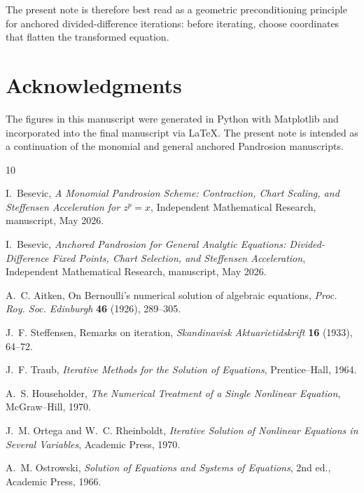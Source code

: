 \documentclass[11pt]{article}
\theoremstyle{definition}
\begin{document}
The present note is therefore best read as a geometric preconditioning principle for anchored divided-difference iterations: before iterating, choose coordinates that flatten the transformed equation.

\section*{Acknowledgments}
The figures in this manuscript were generated in Python with Matplotlib and incorporated into the final manuscript via \LaTeX. The present note is intended as a continuation of the monomial and general anchored Pandrosion manuscripts.

\begin{thebibliography}{10}

I.~Besevic,
\newblock \emph{A Monomial Pandrosion Scheme: Contraction, Chart Scaling, and Steffensen Acceleration for $z^p=x$},
\newblock Independent Mathematical Research, manuscript, May 2026.

I.~Besevic,
\newblock \emph{Anchored Pandrosion for General Analytic Equations: Divided-Difference Fixed Points, Chart Selection, and Steffensen Acceleration},
\newblock Independent Mathematical Research, manuscript, May 2026.

A.~C. Aitken,
\newblock On Bernoulli's numerical solution of algebraic equations,
\newblock \emph{Proc. Roy. Soc. Edinburgh} \textbf{46} (1926), 289--305.

J.~F. Steffensen,
\newblock Remarks on iteration,
\newblock \emph{Skandinavisk Aktuarietidskrift} \textbf{16} (1933), 64--72.

J.~F. Traub,
\newblock \emph{Iterative Methods for the Solution of Equations},
\newblock Prentice--Hall, 1964.

A.~S. Householder,
\newblock \emph{The Numerical Treatment of a Single Nonlinear Equation},
\newblock McGraw--Hill, 1970.

J.~M. Ortega and W.~C. Rheinboldt,
\newblock \emph{Iterative Solution of Nonlinear Equations in Several Variables},
\newblock Academic Press, 1970.

A.~M. Ostrowski,
\newblock \emph{Solution of Equations and Systems of Equations},
\newblock 2nd ed., Academic Press, 1966.

\end{thebibliography}
\end{document}
